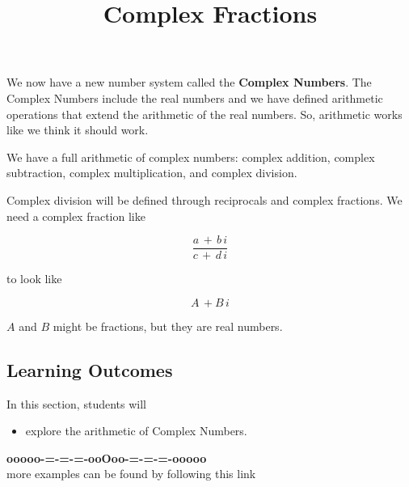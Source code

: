\documentclass{ximera}
\title{Complex Fractions}
\begin{document}
\begin{abstract}
\end{abstract}
\maketitle







We now have a new number system called the \textbf{Complex Numbers}.  The Complex Numbers include the real numbers and we have defined arithmetic operations that extend the arithmetic of the real numbers.  So, arithmetic works like we think it should work.

We have a full arithmetic of complex numbers: complex addition, complex subtraction, complex multiplication, and complex division.



Complex division will be defined through reciprocals and complex fractions.  We need a complex fraction like

\[  \frac{a \, + \, b \, i}{c \, + \, d \, i}     \]


to look like

\[  A \, + B \, i    \]

$A$ and $B$ might be fractions, but they are real numbers. 



\subsection*{Learning Outcomes}

\begin{sectionOutcomes}
In this section, students will 

\begin{itemize}
\item explore the arithmetic of Complex Numbers.
\end{itemize}
\end{sectionOutcomes}











\begin{center}
\textbf{\textcolor{green!50!black}{ooooo-=-=-=-ooOoo-=-=-=-ooooo}} \\

more examples can be found by following this link\\ 

\end{center}
\end{document}
